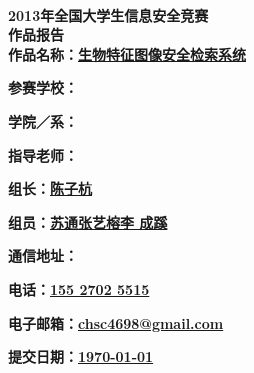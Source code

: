 
\newcommand{\prop}[3] {
  \Large \textsf{\textbf{#1：\underline {#2 \hspace{#3}}}}
}

\begin{titlepage}
  \begin{center}
    ~\\[3.3cm]
    \textsf{\Huge \textbf{2013年全国大学生信息安全竞赛}} \\[0.7cm]
    \textsf{\Huge \textbf{作品报告}} \\[6.5cm]

    \prop{作品名称}{生物特征图像安全检索系统}{3.7cm}
    \prop{参赛学校}{}{11.0cm}
    \prop{学院／系}{}{11.0cm}
    \prop{指导老师}{}{11.0cm}
    \prop{组\hspace{1.2cm}长}{陈子杭}{9.2cm}
    \prop{组\hspace{1.2cm}员}{苏通\hspace{0.7cm}张艺榕\hspace{0.7cm}李
      成蹊}{4.7cm}
    \prop{通信地址}{}{11.0cm}
    \prop{电\hspace{1.2cm}话}{155 2702 5515}{6.9cm}
    \prop{电子邮箱}{chsc4698@gmail.com}{5.2cm}
    \prop{提交日期}{\today}{5.5cm}
  \end{center}
\end{titlepage}